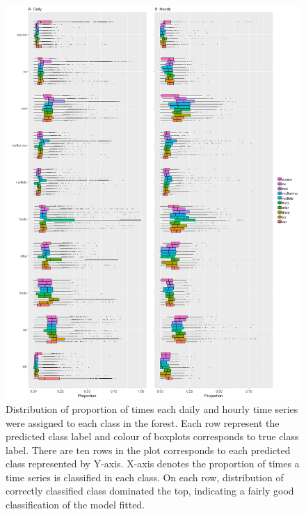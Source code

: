 \documentclass[11pt,a4paper,]{article}
\begin{document}
\begin{figure}
\centering
\includegraphics{figures/oobdailyhourly-1.png}
\caption{\label{fig:oobdailyhourly}Distribution of proportion of times each
daily and hourly time series were assigned to each class in the forest.
Each row represent the predicted class label and colour of boxplots
corresponds to true class label. There are ten rows in the plot
corresponds to each predicted class represented by Y-axis. X-axis
denotes the proportion of times a time series is classified in each
class. On each row, distribution of correctly classified class dominated
the top, indicating a fairly good classification of the model fitted.}
\end{figure}

\newpage
\end{document}
